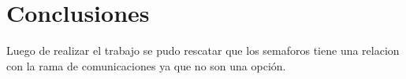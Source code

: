\section{Conclusiones}
Luego de realizar el trabajo se pudo rescatar que los semaforos tiene una relacion con la rama de comunicaciones ya que no son una opción.
\\